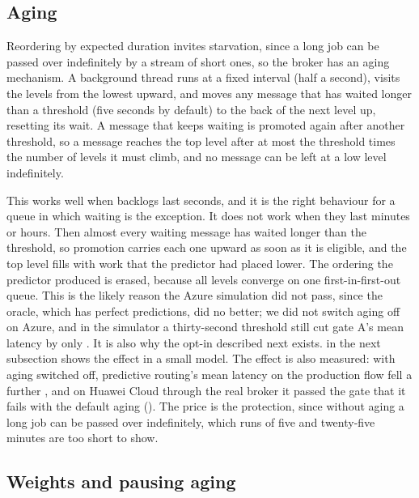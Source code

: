 \subsection{Aging}\label{sec:aging}

Reordering by expected duration invites starvation, since a long job can be passed over indefinitely by a stream of short ones, so the broker has an aging mechanism. A background thread runs at a fixed interval
(half a second), visits the levels from the lowest upward, and moves any message that has waited longer than a threshold (five seconds by default) to the back of the next level up, resetting its wait. A message that keeps waiting is promoted
again after another threshold, so a message reaches the top level after at most the threshold times the number of levels it must climb, and no message can be left at a low level indefinitely.

This works well when backlogs last seconds, and it is the right behaviour for a queue in which waiting is the exception. It does not work when they last minutes or hours. Then almost every waiting message has waited longer than the threshold, so
promotion carries each one upward as soon as it is eligible, and the top level fills with work that the predictor had placed lower. The ordering the predictor produced is erased, because all levels converge on one first-in-first-out queue.
This is the likely reason the Azure simulation did not pass, since the oracle, which has perfect predictions, did no better; we did not switch aging off on Azure, and in the simulator a thirty-second threshold still cut gate A's mean latency by only \SensAzureAgingAThirtyAbs{}. It is also why the opt-in described next exists.  in the next subsection shows the effect in a small model. The effect is also measured: with aging switched off, predictive routing's mean latency on the production flow fell a further \BaseNoAgingVsPredAbs{}, and on Huawei Cloud through the real broker it passed the gate that it fails with the default aging (). The price is the protection, since without aging a long job can be passed over indefinitely, which runs of five and twenty-five minutes are too short to show.

\subsection{Weights and pausing aging}\label{sec:weights}

